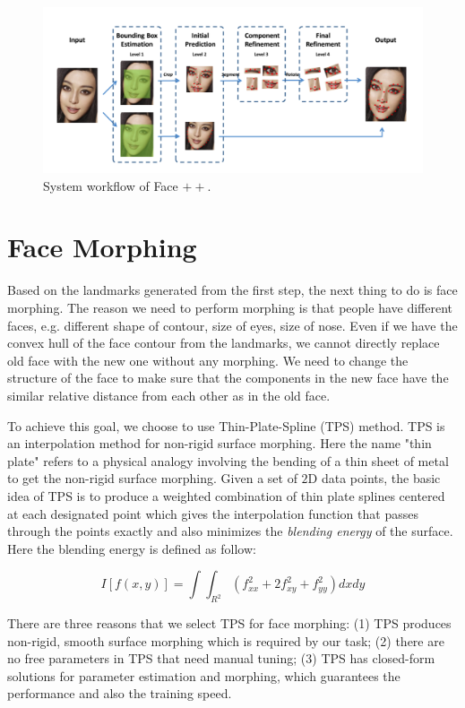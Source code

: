 \documentclass[10pt,twocolumn,letterpaper]{article}
\begin{document}
\begin{figure}
\begin{center}
   \includegraphics[width=0.8\linewidth]{fig/facepp.png}
\end{center}
   \caption{System workflow of Face $++$.}
\label{fig:facepp}
\end{figure}
\section{Face Morphing}
\label{sec:morphing}
Based on the landmarks generated from the first step, the next thing to do is face morphing. The reason we need to perform morphing is that people have different faces, e.g. different shape of contour, size of eyes, size of nose. Even if we have the convex hull of the face contour from the landmarks, we cannot directly replace old face with the new one without any morphing. We need to change the structure of the face to make sure that the components in the new face have the similar relative distance from each other as in the old face.

To achieve this goal, we choose to use Thin-Plate-Spline (TPS) method. TPS is an interpolation method for non-rigid surface morphing. Here the name "thin plate" refers to a physical analogy involving the bending of a thin sheet of metal to get the non-rigid surface morphing. Given a set of $2$D data points, the basic idea of TPS is to produce a weighted combination of thin plate splines centered at each designated point which gives the interpolation function that passes through the points exactly and also minimizes the \emph{blending energy} of the surface. Here the blending energy is defined as follow:

\begin{equation*}
I[f(x, y)] = \int\int_{R^2}(f_{xx}^2 + 2f_{xy}^2 + f_{yy}^2)dxdy
\end{equation*}

There are three reasons that we select TPS for face morphing: (1) TPS produces non-rigid, smooth surface morphing which is required by our task; (2) there are no free parameters in TPS that need manual tuning; (3) TPS has closed-form solutions for parameter estimation and morphing, which guarantees the performance and also the training speed.
\end{document}
